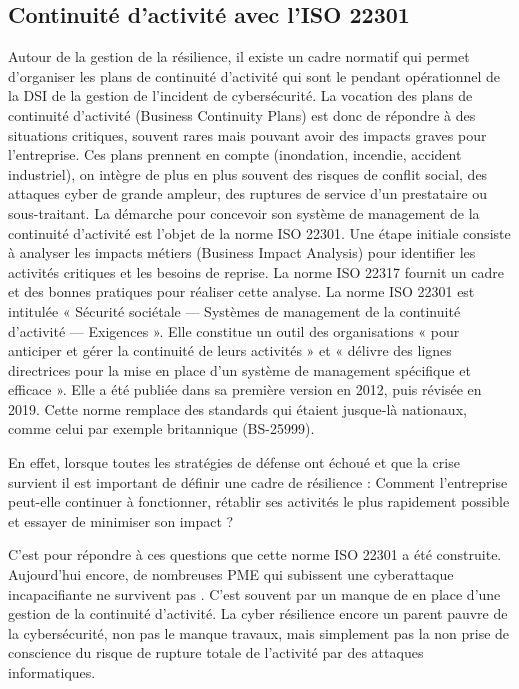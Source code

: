 \subsection{Continuité d'activité  avec l'ISO 22301}

Autour de la gestion de la résilience, il existe un cadre normatif qui permet d'organiser les plans de continuité d'activité qui sont le pendant opérationnel  de la DSI de la gestion de l'incident de cybersécurité.
 La vocation des plans de continuité d’activité (Business Continuity Plans) est donc de répondre à des situations critiques, souvent  rares mais pouvant avoir des impacts graves pour l'entreprise.  Ces plans prennent en compte (inondation, incendie, accident industriel), on  intègre de plus en plus souvent des risques de conflit social, des attaques cyber de grande ampleur, des ruptures de service d’un prestataire  ou sous-traitant. La démarche pour concevoir son système de management de la continuité d’activité est l’objet de la norme ISO 22301. Une étape initiale consiste à analyser les impacts métiers (Business Impact Analysis) pour identifier les activités critiques et les besoins de reprise. La norme ISO 22317 fournit un cadre et des bonnes pratiques pour réaliser cette analyse.
 La norme ISO 22301 est intitulée « Sécurité sociétale — Systèmes de management de la continuité d'activité — Exigences ». Elle constitue un outil des organisations « pour anticiper et gérer la continuité de leurs activités » et « délivre des lignes directrices pour la mise en place d’un système de management spécifique et efficace  ». Elle a été publiée dans sa première version en 2012, puis révisée en 2019. Cette norme remplace des standards qui étaient jusque-là nationaux, comme celui par exemple britannique (BS-25999).
 
 
 En effet, lorsque toutes les stratégies de défense ont échoué et que la crise survient il est important de définir une cadre de résilience :    Comment l'entreprise peut-elle continuer à fonctionner, rétablir ses activités le plus rapidement possible et essayer de minimiser son impact ?
 
 C’est pour répondre à ces questions que  cette norme ISO 22301 a été construite.  Aujourd’hui encore, de nombreuses PME qui subissent une cyberattaque incapacifiante ne survivent pas . C’est  souvent  par un manque de en place d'une gestion de la continuité d’activité. La cyber résilience  encore un parent pauvre de la cybersécurité, non pas le manque travaux, mais simplement pas la non prise de conscience du risque de rupture totale de l'activité par des attaques informatiques.


